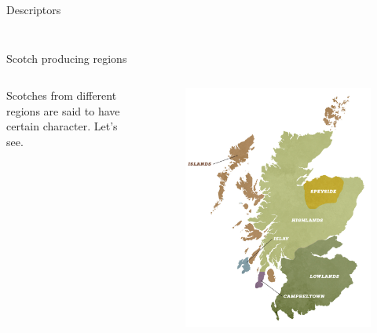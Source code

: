 \documentclass{beamer}
\begin{document}
\begin{frame}{Descriptors}
\begin{columns}
\begin{column}{0.5\textwidth}
\begin{figure}[H]
\begin{center}
				\end{center}
			\end{figure}
		\end{column}
	\end{columns}
\end{frame}

\begin{frame}{Scotch producing regions}
	\begin{columns}
		\begin{column}{0.5\textwidth}
			Scotches from different regions are said to have certain character. Let's see.
		\end{column}
	\begin{column}{0.5\textwidth}
	\begin{figure}[H]
		\begin{center}
			\includegraphics[scale = 0.55]{scotland_regions}
		\end{center}
	\end{figure}
\end{column}

\end{columns}
\end{frame}
\end{document}
